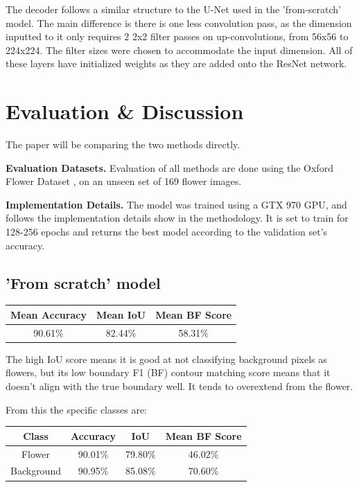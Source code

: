 \documentclass{article}
\begin{document}
The decoder follows a similar structure to the U-Net used in the 'from-scratch' model. The main difference is there is one less convolution pass, as the dimension inputted to it only requires 2 2x2 filter passes on up-convolutions, from 56x56 to 224x224. The filter sizes were chosen to accommodate the input dimension. All of these layers have initialized weights as they are added onto the ResNet network.

\section{Evaluation \& Discussion}
\label{sec:majhead}

The paper will be comparing the two methods directly. 

\textbf{Evaluation Datasets.}
Evaluation of all methods are done using the Oxford Flower Dataset \autocite{nilsbackVisualVocabularyFlower2006}, on an unseen set of 169 flower images.

\textbf{Implementation Details.}
The model was trained using a GTX 970 GPU, and follows the implementation details show in the methodology. It is set to train for 128-256 epochs and returns the best model according to the validation set's accuracy.

\subsection{'From scratch' model}

\begin{center}
    \begin{tabular}{|c | c  | c |} 
     \hline
     Mean Accuracy & Mean IoU & Mean BF Score \\ [0.5ex] 
     \hline
     90.61\% & 82.44\% & 58.31\% \\ 
     \hline
    \end{tabular}
\end{center}

The high IoU score means it is good at not classifying background pixels as flowers, but its low boundary F1 (BF) contour matching score means that it doesn't align with the true boundary well. It tends to overextend from the flower. 

From this the specific classes are:


\begin{center}
    \begin{tabular}{| c |c | c  | c |} 
     \hline
    Class & Accuracy & IoU & Mean BF Score \\ [0.5ex] 
     \hline
     Flower & 90.01\% & 79.80\% & 46.02\% \\ 
     \hline
     Background & 90.95\% & 85.08\% & 70.60\% \\ 
     \hline
    \end{tabular}
\end{center}
\end{document}

